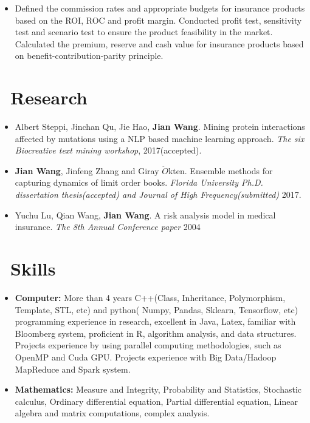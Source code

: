 \documentclass{resume}
\begin{document}
\large {}
\begin{itemize}\large
  \item Defined the commission rates and appropriate budgets for insurance products based on the ROI,  ROC and profit margin. Conducted profit test,  sensitivity test and scenario test to ensure the product feasibility in the market. Calculated the premium,  reserve and cash value for insurance products based on benefit-contribution-parity principle.
\end{itemize}
\section{\faBook\ Research}

\begin{itemize}[parsep=0.5ex]\large
  \item Albert Steppi, Jinchan Qu, Jie Hao, \textbf{Jian Wang}. Mining protein interactions affected by mutations using a NLP based machine learning approach. \textit{The six Biocreative text mining workshop}, 2017(accepted).
  \item \textbf{Jian Wang}, Jinfeng Zhang and Giray $\ddot{O}$kten. Ensemble methods for capturing dynamics of limit order books. \textit{Florida University Ph.D. dissertation thesis(accepted) and Journal of High Frequency(submitted)} 2017.
  \item Yuchu Lu, Qian Wang, \textbf{Jian Wang}. A risk analysis model in medical insurance. \textit{The 8th Annual Conference paper} 2004 
  
\end{itemize}
    
\section{\faWrench
\ Skills}
\begin{itemize}[parsep=0.5ex]\large
  \item \textbf{Computer:} More than 4 years C++(Class,  Inheritance,  Polymorphism,  Template,  STL,  etc) and python( Numpy,  Pandas, 
  Sklearn,  Tensorflow,  etc) programming experience in research,   excellent in Java,  Latex,  familiar with Bloomberg system, proficient in R, algorithm analysis, and data structures. Projects experience by using parallel computing methodologies,  such as OpenMP and Cuda GPU.  Projects experience with Big Data/Hadoop MapReduce and Spark system. 
  
  \item \textbf{Mathematics:}
   Measure and Integrity,  Probability and Statistics,  Stochastic calculus, Ordinary differential equation,
  Partial differential equation,  Linear algebra and matrix computations,  complex analysis.
  
\end{itemize}
\end{document}
